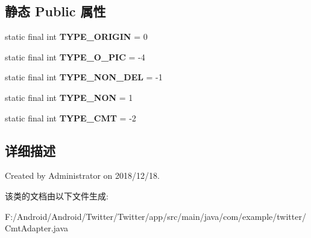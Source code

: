 \subsection*{静态 Public 属性}
\begin{DoxyCompactItemize}
\item 
\mbox{\label{classcom_1_1example_1_1twitter_1_1_cmt_adapter_aa4dd6ecf56de4b013b4e2d20aca8644f}} 
static final int {\bfseries T\+Y\+P\+E\+\_\+\+O\+R\+I\+G\+IN} = 0
\item 
\mbox{\label{classcom_1_1example_1_1twitter_1_1_cmt_adapter_a8194f6b3496ed97c3c7cf01c620453ea}} 
static final int {\bfseries T\+Y\+P\+E\+\_\+\+O\+\_\+\+P\+IC} = -\/4
\item 
\mbox{\label{classcom_1_1example_1_1twitter_1_1_cmt_adapter_a62189c4263f9bc0528b0d5fb626bfce4}} 
static final int {\bfseries T\+Y\+P\+E\+\_\+\+N\+O\+N\+\_\+\+D\+EL} = -\/1
\item 
\mbox{\label{classcom_1_1example_1_1twitter_1_1_cmt_adapter_a10a4789ecb1582883748f7a4d9b75120}} 
static final int {\bfseries T\+Y\+P\+E\+\_\+\+N\+ON} = 1
\item 
\mbox{\label{classcom_1_1example_1_1twitter_1_1_cmt_adapter_ad119f739aad0043038b9bd6a6c5b9523}} 
static final int {\bfseries T\+Y\+P\+E\+\_\+\+C\+MT} = -\/2
\end{DoxyCompactItemize}


\subsection{详细描述}
Created by Administrator on 2018/12/18. 

该类的文档由以下文件生成\+:\begin{DoxyCompactItemize}
\item 
F\+:/\+Android/\+Android/\+Twitter/\+Twitter/app/src/main/java/com/example/twitter/Cmt\+Adapter.\+java\end{DoxyCompactItemize}

